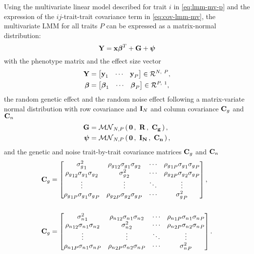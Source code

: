 Using the multivariate linear model described for trait \(i\) in \cref{eq:lmm-mv-p} and the expression of the \(ij\)-trait-trait covariance term in \cref{eq:cov-lmm-mv}, the multivariate LMM for all traits \(P\) can be expressed as a matrix-normal distribution:
%
\begin{equation}
\boldsymbol{\mathbf{Y}} = \boldsymbol{\mathbf{x}}\boldsymbol{\mathbf{\beta}}^T + \boldsymbol{\mathbf{G}} + \boldsymbol{\mathbf{\psi}}
\label{eq:lmm-mv}
\end{equation}
%
with the phenotype matrix  and the effect size vector \tmat{\beta}
%
\begin{align}
 \mat{Y} &=
  \begin{bmatrix} 
 	\mat{y}_{1} & \cdots & \mat{y}_{P} 
 \end{bmatrix} \inR N P,\\
%
 \mat{\beta} &=
  \begin{bmatrix} 
 	\mat{\beta}_{1} & \cdots & \mat{\beta}_{P} 
 \end{bmatrix} \inR P 1,\\
 \end{align}
the random genetic effect  and the random noise effect \tmat{\psi} following a matrix-variate normal distribution with row covariance  and \(\boldsymbol{\mathbf{I}}_N\) and column covariance \(\boldsymbol{\mathbf{C}}_g\) and  \(\boldsymbol{\mathbf{C}}_n\)
\begin{align}
 \mat{G} &= \matrixnormal N P 0 {\mat{R}}{\mat{C}_g},\\
%
 \mat{\psi} &= \matrixnormal N P 0 {\mat{I}_N}{\mat{C}_n},
 \end{align}
%
and the genetic and noise trait-by-trait covariance matrices \(\boldsymbol{\mathbf{C}}_g\) and  \(\boldsymbol{\mathbf{C}}_n\) 
%
 \begin{align}
 \mat{C}_g &=
  \begin{bmatrix}
  {\sigma_g^2}_1 &  {\rho_g}_{12} {\sigma_g}_1 {\sigma_g}_2 & \cdots & {\rho_g}_{1P} {\sigma_g}_1 {\sigma_g}_P \\
  {\rho_g}_{12} {\sigma_g}_1 {\sigma_g}_2 & {\sigma_g^2}_2 & \cdots & {\rho_g}_{2P} {\sigma_g}_2 {\sigma_g}_P \\
   \vdots & \vdots & \ddots & \vdots \\
   {\rho_g}_{1P} {\sigma_g}_1 {\sigma_g}_P  &  {\rho_g}_{2P} {\sigma_g}_2 {\sigma_g}_P  & \cdots &{\sigma_g^2}_P 
   \end{bmatrix}, \\ \\
 \mat{C}_g &=
  \begin{bmatrix}
  {\sigma_n^2}_1 &  {\rho_n}_{12} {\sigma_n}_1 {\sigma_n}_2 & \cdots & {\rho_n}_{1P} {\sigma_n}_1 {\sigma_n}_P \\
  {\rho_n}_{12} {\sigma_n}_1 {\sigma_n}_2 & {\sigma_n^2}_2 & \cdots & {\rho_n}_{2P} {\sigma_n}_2 {\sigma_n}_P \\
   \vdots & \vdots & \ddots & \vdots \\
   {\rho_n}_{1P} {\sigma_n}_1 {\sigma_n}_P  &  {\rho_n}_{2P} {\sigma_n}_2 {\sigma_n}_P  & \cdots &{\sigma_n^2}_P 
   \end{bmatrix}.
%
\end{align}
